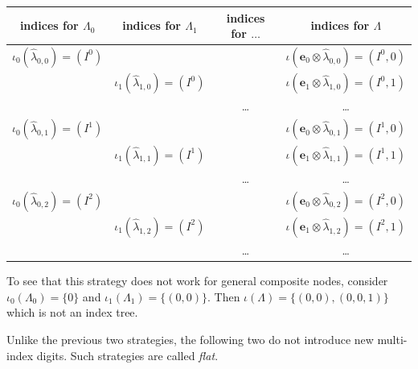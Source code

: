 \documentclass[a4paper,10pt,headings=normal,bibliography=totoc]{scrartcl}
\begin{document}
\begin{itemize}
    \begin{tabular}{c|c|c|c}
      indices for $\Lambda_0$ &
      indices for $\Lambda_1$ &
      indices for $\dots$ &
      indices for $\Lambda$ \\
      \hline
      $\iota_0(\hat{\lambda}_{0,0}) = (I^0)$ & & &
        $\iota(\mathbf{e}_0 \otimes \hat{\lambda}_{0,0}) = (I^0,0)$ \\
      & $\iota_1(\hat{\lambda}_{1,0}) = (I^0)$ & &
        $\iota(\mathbf{e}_1 \otimes \hat{\lambda}_{1,0}) = (I^0,1)$ \\
      & & \dots &
        \dots \\
      $\iota_0(\hat{\lambda}_{0,1}) = (I^1)$ & & &
        $\iota(\mathbf{e}_0 \otimes \hat{\lambda}_{0,1}) = (I^1,0)$ \\
      & $\iota_1(\hat{\lambda}_{1,1}) = (I^1)$ & &
        $\iota(\mathbf{e}_1 \otimes \hat{\lambda}_{1,1}) = (I^1,1)$ \\
      & & \dots &
        \dots \\
      $\iota_0(\hat{\lambda}_{0,2}) = (I^2)$ & & &
        $\iota(\mathbf{e}_0 \otimes \hat{\lambda}_{0,2}) = (I^2,0)$ \\
      & $\iota_1(\hat{\lambda}_{1,2}) = (I^2)$ & &
        $\iota(\mathbf{e}_1 \otimes \hat{\lambda}_{1,2}) = (I^2,1)$ \\
      & & \dots &
        \dots \\
    \end{tabular}

    To see that this strategy does not work for general composite nodes,
    consider $\iota_0(\Lambda_0) = \{0\}$ and $\iota_1(\Lambda_1) = \{(0,0)\}$.
    Then $\iota(\Lambda) = \{(0,0), (0,0,1)\}$ which is not an index tree.
\end{itemize}
Unlike the previous two strategies, the following two do not introduce new
multi-index digits. Such strategies are called \emph{flat}.
\end{document}
